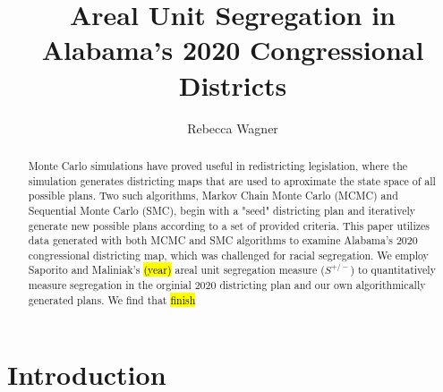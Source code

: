\documentclass{article}
\title{Areal Unit Segregation in Alabama's 2020 Congressional Districts }
\author{Rebecca Wagner}
\date{}
\begin{document}
\maketitle

\begin{abstract}
Monte Carlo simulations have proved useful in redistricting legislation, where the simulation generates districting maps that are used to aproximate the state space of all possible plans. Two such algorithms, Markov Chain Monte Carlo (MCMC) and Sequential Monte Carlo (SMC), begin with a "seed" districting plan and iteratively generate new possible plans according to a set of provided criteria. This paper utilizes data generated with both MCMC and SMC algorithms to examine Alabama's 2020 congressional districting map, which was challenged for racial segregation. We employ Saporito and Maliniak's \hl{(year)} areal unit segregation measure ($S^{+/-}$) to quantitatively measure segregation in the orginial 2020 districting plan and our own algorithmically generated plans. We find that \hl{finish}
\end{abstract}

\section{Introduction}
\end{document}
